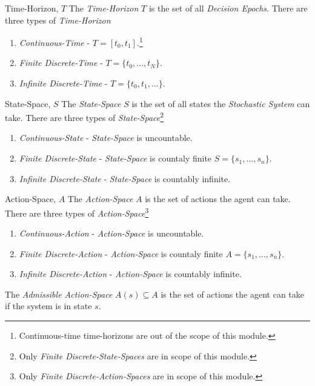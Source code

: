 \documentclass[11pt,a4paper]{article}
\begin{document}
  \begin{definition}{Time-Horizon, $T$}
    The \textit{Time-Horizon} $T$ is the set of all \textit{Decision Epochs}. There are three types of \textit{Time-Horizon}
    \begin{enumerate}
      \item \textit{Continuous-Time} - $T=[t_0,t_1]$.\footnote{Continuous-time time-horizons are out of the scope of this module.}
      \item \textit{Finite Discrete-Time} - $T=\{t_0,\dots,t_N\}$.
      \item \textit{Infinite Discrete-Time} - $T=\{t_0,t_1,\dots\}$.
    \end{enumerate}
  \end{definition}

  \begin{definition}{State-Space, $S$}
    The \textit{State-Space} $S$ is the set of all states the \textit{Stochastic System} can take. There are three types of \textit{State-Space}\footnote{Only \textit{Finite Discrete-State-Spaces} are in scope of this module.}
    \begin{enumerate}
      \item \textit{Continuous-State} - \textit{State-Space} is uncountable.
      \item \textit{Finite Discrete-State} - \textit{State-Space} is countaly finite $S=\{s_1,\dots,s_n\}$.
      \item \textit{Infinite Discrete-State} - \textit{State-Space} is countably infinite.
    \end{enumerate}
  \end{definition}

  \begin{definition}{Action-Space, $A$}
    The \textit{Action-Space} $A$ is the set of actions the agent can take. There are three types of \textit{Action-Space}\footnote{Only \textit{Finite Discrete-Action-Spaces} are in scope of this module.}
    \begin{enumerate}
      \item \textit{Continuous-Action} - \textit{Action-Space} is uncountable.
      \item \textit{Finite Discrete-Action} - \textit{Action-Space} is countaly finite $A=\{s_1,\dots,s_n\}$.
      \item \textit{Infinite Discrete-Action} - \textit{Action-Space} is countably infinite.
    \end{enumerate}
    The \textit{Admissible Action-Space} $A(s)\subseteq A$ is the set of actions the agent can take if the system is in state $s$.
  \end{definition}
\end{document}
